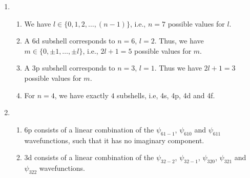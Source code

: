 \documentclass[10pt]{article}
\begin{document}
\begin{enumerate}
                \item 
                \begin{enumerate}
                        \item We have $l \in \{0, 1, 2, \dots, (n-1)\}$, i.e., $n = 7$ possible values for $l$.
                        \item A 6d subshell corresponds to $n = 6$, $l = 2$. Thus, we have $m \in \{0, \pm 1, \dots, \pm l\}$,
                        i.e., $2l + 1 = 5$ possible values for $m$.
                        \item A 3p subshell corresponds to $n = 3$, $l = 1$. Thus we have $2l + 1 = 3$ possible values for $m$.
                        \item For $n = 4$, we have exactly $4$ subshells, i.e, 4s, 4p, 4d and 4f.
                \end{enumerate}

                \item
                \begin{enumerate}
                        \item 6p consists of a linear combination of the $\psi_{61-1}$, $\psi_{610}$ and $\psi_{611}$ wavefunctions, such
                        that it has no imaginary component.
                        \item 3d consists of a linear combination of the $\psi_{32-2}$, $\psi_{32-1}$, $\psi_{320}$, $\psi_{321}$ and $\psi_{322}$
                        wavefunctions.
                \end{enumerate}
        \end{enumerate}
\end{document}
